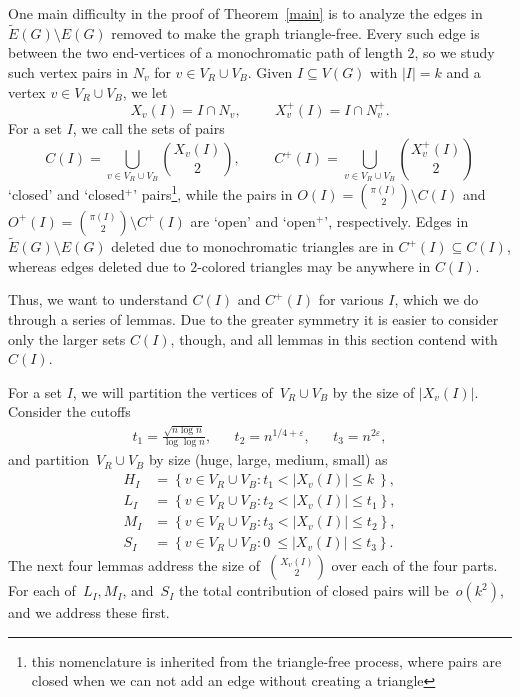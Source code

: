\documentclass{article}
\begin{document}
One main difficulty in the proof of Theorem~\ref{main} is to analyze the edges in $\tilde{E}(G)\setminus E(G)$ removed to make the graph triangle-free. Every such edge is between the two end-vertices of a monochromatic path of length $2$, so we study such vertex pairs in $N_v$ for $v\in V_R\cup V_B$.
Given $I \subseteq V(G)$ with $|I| = k$ and a vertex $v\in V_R\cup V_B$, we let
\[
X_{v}(I) = I \cap N_v,\hspace{1cm} X_{v}^+(I) = I \cap N_v^+.
\]   
For a set $I$, we call the sets of pairs 
\[
C(I)=\bigcup_{v \in V_R \cup V_B} \binom{X_v(I)}{2} ,\hspace{1cm} C^+(I)=\bigcup_{v \in V_R \cup V_B} \binom{X_v^+(I)}{2}
\]
`closed' and `closed$^+$' pairs\footnote{this nomenclature is inherited from the triangle-free process, where pairs are closed when we can not add an edge without creating a triangle}, while the pairs in $O(I)={\pi(I)\choose 2}\setminus C(I)$ and $O^+(I)={\pi(I)\choose 2}\setminus C^+(I)$ are `open' and `open$^+$', respectively.
Edges in $\tilde{E}(G)\setminus E(G)$ deleted due to monochromatic triangles are in $C^+(I)\subseteq C(I)$, whereas edges deleted due to $2$-colored triangles may be anywhere in $C(I)$.

Thus, we want to understand $C(I)$ and $C^+(I)$ for various $I$, which we do through a series of lemmas.
Due to the greater symmetry it is easier to consider only the larger sets $C(I)$, though, and all lemmas in this section contend with $C(I)$.





For a set $I$, we will partition the vertices of~$V_R \cup V_B$ by the size of $|X_v(I)|$.  Consider the cutoffs \begin{align*} 
t_1 = \frac{\sqrt{n \log n}}{\log \log n}, && t_2 = n^{1/4 + \varepsilon}, && t_3 = n^{2\varepsilon},
\end{align*} 
and partition~$V_R \cup V_B$ by size (huge, large, medium, small) as
\begin{align*} 
H_I &= \left\{v \in V_R \cup V_B: t_1 < |X_v(I)| \le k ~\right\},\\
L_I &= \left\{v \in V_R \cup V_B: t_2 < |X_v(I)| \leq t_1 \right\},\\
M_I &= \left\{v \in V_R \cup V_B: t_3 < |X_v(I)| \le t_2 \right\},\\
S_I &= \left\{v \in V_R \cup V_B: 0~ \le |X_v(I)| \le t_3 \right\}.
\end{align*}
The next four lemmas address the size of~$\binom{X_v(I)}{2}$ over each of the four parts.
For each of~$L_I,M_I$, and~$S_I$ the total contribution of closed pairs will be~$o(k^2)$, and we address these first. 
\end{document}
